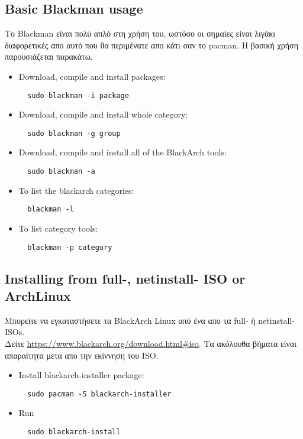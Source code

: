 \documentclass[a4paper, oneside, 11pt]{book}
\begin{document}
\subsection{Basic Blackman usage} Το Blackman είναι πολύ απλό στη χρήση του, ωστόσο
οι σημαίες είναι λιγάκι διαφορετικές απο αυτό που θα περιμένατε απο κάτι σαν το pacman.
Η βασική χρήση παρουσιάζεται παρακάτω. 
\begin{itemize}
\item Download, compile and install packages:
\begin{lstlisting}
  sudo blackman -i package
\end{lstlisting}

\item Download, compile and install whole category:
\begin{lstlisting}
  sudo blackman -g group
\end{lstlisting}

\item Download, compile and install all of the BlackArch tools:
\begin{lstlisting}
  sudo blackman -a
\end{lstlisting}

\item To list the blackarch categories:
\begin{lstlisting}
  blackman -l
\end{lstlisting}

\item To list category tools:
\begin{lstlisting}
  blackman -p category
\end{lstlisting}

\end{itemize}

\subsection{Installing from full-, netinstall- ISO or ArchLinux}
Μπορείτε να εγκαταστήσετε τα BlackArch Linux από ένα απο τα full- ή netinstall-ISOs.\\Δείτε
\url{https://www.blackarch.org/download.html#iso}. Τα ακόλουθα βήματα είναι
απαραίτητα μετα απο την εκίννηση του ISO.
\begin{itemize}
\item Install blackarch-installer package:
\begin{lstlisting}
  sudo pacman -S blackarch-installer
\end{lstlisting}

\item Run
\begin{lstlisting}
  sudo blackarch-install
\end{lstlisting}

\end{itemize}
\end{document}
